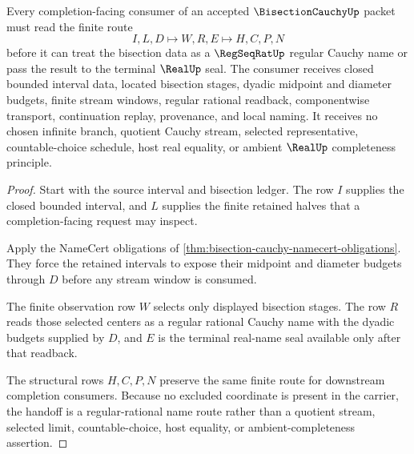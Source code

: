 \begin{theorem}
\label{thm:bisection-cauchy-regseqrat-handoff}
Every completion-facing consumer of an accepted $\BisectionCauchyUp$ packet must read the finite route
$$
I,L,D \longmapsto W,R,E \longmapsto H,C,P,N
$$
before it can treat the bisection data as a $\RegSeqRatUp$ regular Cauchy name or pass the result to the terminal $\RealUp$ seal. The consumer receives closed bounded interval data, located bisection stages, dyadic midpoint and diameter budgets, finite stream windows, regular rational readback, componentwise transport, continuation replay, provenance, and local naming. It receives no chosen infinite branch, quotient Cauchy stream, selected representative, countable-choice schedule, host real equality, or ambient $\RealUp$ completeness principle.
\end{theorem}
\begin{proof}
Start with the source interval and bisection ledger. The row $I$ supplies the closed bounded interval, and $L$ supplies the finite retained halves that a completion-facing request may inspect.

Apply the NameCert obligations of \autoref{thm:bisection-cauchy-namecert-obligations}. They force the retained intervals to expose their midpoint and diameter budgets through $D$ before any stream window is consumed.

The finite observation row $W$ selects only displayed bisection stages. The row $R$ reads those selected centers as a regular rational Cauchy name with the dyadic budgets supplied by $D$, and $E$ is the terminal real-name seal available only after that readback.

The structural rows $H,C,P,N$ preserve the same finite route for downstream completion consumers. Because no excluded coordinate is present in the carrier, the handoff is a regular-rational name route rather than a quotient stream, selected limit, countable-choice, host equality, or ambient-completeness assertion.
\end{proof}

